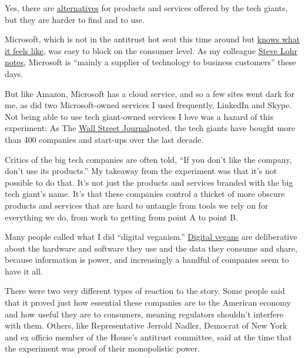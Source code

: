 Yes, there are
\href{https://www.nytimes.com/2020/07/29/technology/personaltech/big-tech-power-how-to-fight.html}{alternatives}
for products and services offered by the tech giants, but they are
harder to find and to use.

Microsoft, which is not in the antitrust hot seat this time around but
\href{https://www.nytimes.com/2019/06/23/technology/antitrust-tech-microsoft-lessons.html}{knows
what it feels like}, was easy to block on the consumer level. As my
colleague
\href{https://www.nytimes.com/2018/11/29/technology/microsoft-apple-worth-how.html}{Steve
Lohr notes}, Microsoft is ``mainly a supplier of technology to business
customers'' these days.

But like Amazon, Microsoft has a cloud service, and so a few sites went
dark for me, as did two Microsoft-owned services I used frequently,
LinkedIn and Skype. Not being able to use tech giant-owned services I
love was a hazard of this experiment: As The
\href{https://www.wsj.com/articles/beware-the-big-tech-backlash-11545227197?mod=e2tw}{Wall
Street Journal}noted, the tech giants have bought more than 400
companies and start-ups over the last decade.

Critics of the big tech companies are often told, ``If you don't like
the company, don't use its products.'' My takeaway from the experiment
was that it's not possible to do that. It's not just the products and
services branded with the big tech giant's name. It's that these
companies control a thicket of more obscure products and services that
are hard to untangle from tools we rely on for everything we do, from
work to getting from point A to point B.

Many people called what I did ``digital veganism.''
\href{https://observer.com/2011/06/what-is-digital-veganism-cody-brown-explains-his-catchphrase/}{Digital
vegans} are deliberative about the hardware and software they use and
the data they consume and share, because information is power, and
increasingly a handful of companies seem to have it all.

There were two very different types of reaction to the story. Some
people said that it proved just how essential these companies are to the
American economy and how useful they are to consumers, meaning
regulators shouldn't interfere with them. Others, like Representative
Jerrold Nadler, Democrat of New York and ex officio member of the
House's antitrust committee, said at the time that the experiment was
proof of their monopolistic power.

